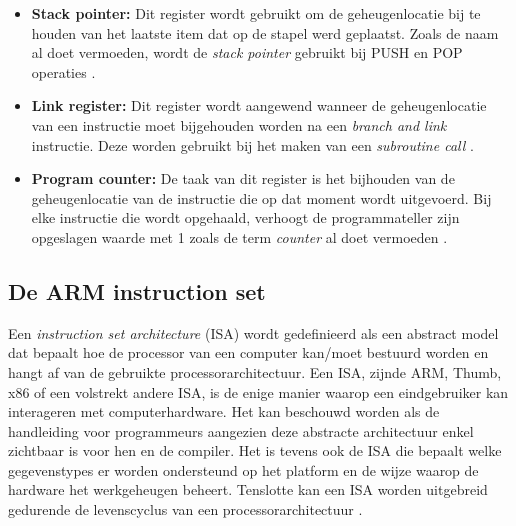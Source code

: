 \begin{itemize}
    \item \textbf{Stack pointer:} Dit register wordt gebruikt om de geheugenlocatie bij te houden van het laatste item dat op de stapel werd geplaatst. Zoals de naam al doet vermoeden, wordt de \textit{stack pointer} gebruikt bij PUSH en POP operaties \autocite{ARM2022a}.
    \item \textbf{Link register:} Dit register wordt aangewend wanneer de geheugenlocatie van een instructie moet bijgehouden worden na een \textit{branch and link} instructie. Deze worden gebruikt bij het maken van een \textit{subroutine call} \autocite{Seal2000}.
    \item \textbf{Program counter:}  De taak van dit register is het bijhouden van de geheugenlocatie van de instructie die op dat moment wordt uitgevoerd. Bij elke instructie die wordt opgehaald, verhoogt de programmateller zijn opgeslagen waarde met 1 zoals de term \textit{counter} al doet vermoeden \autocite{Seal2000}.
\end{itemize}

\subsection{De ARM instruction set}
Een \textit{instruction set architecture} (ISA) wordt gedefinieerd als een abstract model dat bepaalt hoe de processor van een computer kan/moet bestuurd worden en hangt af van de gebruikte processorarchitectuur. Een ISA, zijnde ARM, Thumb, x86 of een volstrekt andere ISA, is de enige manier waarop een eindgebruiker kan interageren met computerhardware. Het kan beschouwd worden als de handleiding voor programmeurs aangezien deze abstracte architectuur enkel zichtbaar is voor hen en de compiler. Het is tevens ook de ISA die bepaalt welke gegevenstypes er worden ondersteund op het platform en de wijze waarop de hardware het werkgeheugen beheert. Tenslotte kan een ISA worden uitgebreid gedurende de levenscyclus van een processorarchitectuur \autocite{ARM2022b}.

